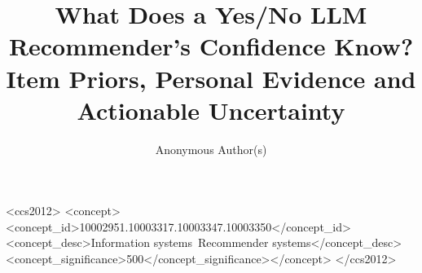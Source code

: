 \documentclass[sigconf,natbib=true,anonymous=true]{acmart}
\begin{document}
\title{What Does a Yes/No LLM Recommender's Confidence Know?\\
Item Priors, Personal Evidence and Actionable Uncertainty}

\author{Anonymous Author(s)}

\begin{abstract}

\end{abstract}

\begin{CCSXML}
<ccs2012>
<concept><concept_id>10002951.10003317.10003347.10003350</concept_id>
<concept_desc>Information systems~Recommender systems</concept_desc><concept_significance>500</concept_significance></concept>
</ccs2012>
\end{CCSXML}

\maketitle









\appendix




\end{document}
